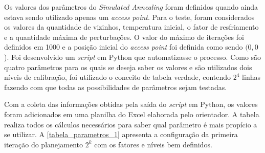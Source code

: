 \documentclass[
	12pt,				%
	twoside,			%
	a4paper,			%
	english,			%
	french,				%
	spanish,			%
	brazil				%
	]{abntex2}
\begin{document}
Os valores dos parâmetros do \emph{Simulated Annealing} foram definidos
quando ainda estava sendo utilizado apenas um \emph{access point}. Para
o teste, foram considerados os valores da quantidade de vizinhos,
temperatura inicial, o fator de resfriamento e a quantidade máxima de
perturbações. O valor do máximo de iterações foi definidos em 1000 e a
posição inicial do \emph{access point} foi definida como sendo
\((0, 0\)). Foi desenvolvido um \emph{script} em Python que
automatizasse o processo. Como são quatro parâmetros para os quais se
deseja saber os valores e são utilizados dois níveis de calibração, foi
utilizado o conceito de tabela verdade, contendo \(2^{4}\) linhas
fazendo com que todas as possibilidades de parâmetros sejam testadas.

Com a coleta das informações obtidas pela saída do \emph{script} em
Python, os valores foram adicionados em uma planilha do Excel elaborada
pelo orientador. A tabela realiza todos os cálculos necessários para
saber qual parâmetro é mais propício a se utilizar. A
\autoref{tabela_parametros_1} apresenta a configuração da primeira
iteração do planejamento \(2^{k}\) com os fatores e níveis bem
definidos.
\end{document}

